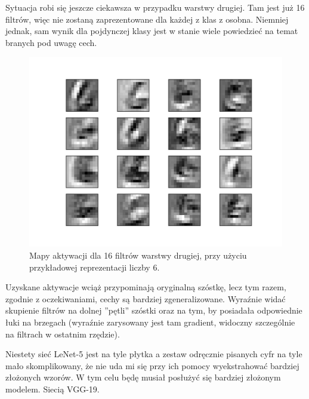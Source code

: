 Sytuacja robi się jeszcze ciekawsza w przypadku warstwy drugiej. Tam jest już 16 filtrów, więc nie zostaną zaprezentowane dla każdej z klas z osobna. Niemniej jednak, sam wynik dla pojdynczej klasy jest w stanie wiele powiedzieć na temat branych pod uwagę cech.

\begin{figure}[ht]
\centerline{\includegraphics[scale=0.75]{resources/second_layer_gd_lenet.png}}
\caption{Mapy aktywacji dla 16 filtrów warstwy drugiej, przy użyciu przykładowej reprezentacji liczby 6.}
\label{fig:lenet5-mapy-aktywacji-l2}
\end{figure}

Uzyskane aktywacje wciąż przypominają oryginalną szóstkę, lecz tym razem, zgodnie z oczekiwaniami, cechy są bardziej zgeneralizowane.
Wyraźnie widać skupienie filtrów na dolnej ''pętli'' szóstki oraz na tym, by posiadała odpowiednie łuki na brzegach (wyraźnie zarysowany jest tam gradient, widoczny szczególnie na filtrach w ostatnim rzędzie).

Niestety sieć LeNet-5 jest na tyle płytka a zestaw odręcznie pisanych cyfr na tyle mało skomplikowany, że nie uda mi się przy ich pomocy wyekstrahować bardziej złożonych wzorów. W tym celu będę musiał posłużyć się bardziej złożonym modelem. Siecią VGG-19. 
